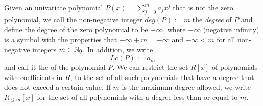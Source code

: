 Given an univariate polynomial $P(x)=\sum_{j=0}^m a_jx^j$ that is not the zero polynomial, we call the non-negative integer $deg(P):=m$  the \textit{degree} of $P$ and define the degree of the zero polynomial to be $-\infty$, where $-\infty$ (negative infinity) is a symbol with the properties that $-\infty + m = -\infty$ and $-\infty < m$ for all non-negative integers $m\in\mathbb{N}_0$. In addition, we write
\begin{equation}
\label{def_leading_coefficient}
Lc(P):=a_m
\end{equation}
and call it the  of the polynomial $P$. We can restrict the set $R[x]$ of  polynomials with coefficients in $R$, to the set of all such polynomials that have a degree that does not exceed a certain value. If $m$ is the maximum degree allowed, we write $R_{\leq m}[x]$ for the set of all polynomials with a degree less than or equal to $m$.
